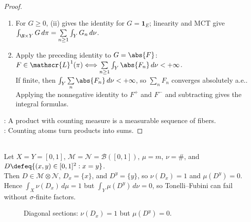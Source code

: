 \begin{proposition}
\begin{proof}
\begin{enumerate}[label=(\roman*)]
By (i), $H_a\in2^\N\otimes\mathcal{N}$, so $F$ is product-measurable.
\item[$(iv)$] For $G\geq0$, (ii) gives the identity for $G=\mathbf{1}_E$; linearity and MCT give $\int_{\N\times Y}G\,d\pi=\sum\limits_{n\geq1}\int_YG_n\,d\nu$.
\item[$(iv)$] Apply the preceding identity to $G=\abs{F}$: $F\in\mathscr{L}^1(\pi)\Longleftrightarrow\sum\limits_{n\geq1}\int_Y\abs{F_n}\,d\nu<+\infty$.\\
If finite, then $\int_Y\sum\limits_n\abs{F_n}\,d\nu<+\infty$, so $\sum\limits_nF_n$ converges absolutely a.e..\\
Applying the nonnegative identity to $F^+$ and $F^-$ and subtracting gives the integral formulas.
\end{enumerate}
: A product with counting measure is a measurable sequence of fibers.\\
: Counting atoms turn products into sums.
\end{proof}
\end{proposition}

\begin{example} \label{ex:diagonal-counting-lebesgue-sigma-finite-failure} \\
Let $X=Y=[0,1]$, $\mathcal{M}=\mathcal{N}=\mathcal{B}([0,1])$, $\mu=m$, $\nu=\#$, and $D\defeq\{(x,y)\in[0,1]^2:x=y\}$.\\
Then $D\in\mathcal{M}\otimes\mathcal{N}$, $D_x=\{x\}$, and $D^y=\{y\}$, so $\nu(D_x)=1$ and $\mu(D^y)=0$.\\
Hence $\int_X\nu(D_x)\,d\mu=1$ but $\int_Y\mu(D^y)\,d\nu=0$, so Tonelli--Fubini can fail without $\sigma$-finite factors.
\end{example}

\begin{figure}[H]
  \centering
  
  \caption{Diagonal sections: $\nu(D_x)=1$ but $\mu(D^y)=0$.}
  \label{fig:product-diagonal-slices-counterexample}
\end{figure}

